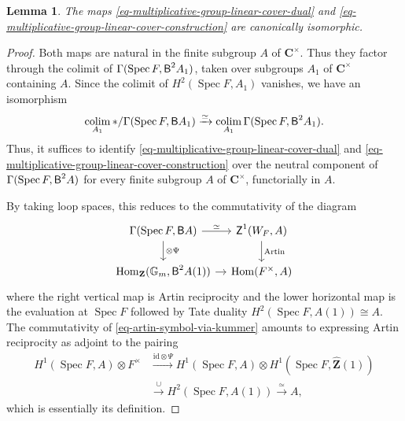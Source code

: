 \documentclass[10pt,english,reqno]{amsart}
\newcommand{\integers}{\mathbf Z}
\newcommand{\complexes}{\mathbf C}
\newcommand{\cycle}{\textnormal{\textsf{Z}}}
\newcommand{\Hom}{\operatorname{Hom}}
\newcommand{\id}{\mathrm{id}}
\newcommand{\deloop}{\textnormal{\textsf{B}}}
\DeclareMathOperator*\colim{colim}
\newcommand{\Spec}{\operatorname{Spec}}
\newtheorem{lem}[subsubsection]{Lemma}
\theoremstyle{definition}
\numberwithin{equation}{section}
\begin{document}
\begin{lem}
The maps \eqref{eq-multiplicative-group-linear-cover-dual} and \eqref{eq-multiplicative-group-linear-cover-construction} are canonically isomorphic.
\end{lem}
\begin{proof}
Both maps are natural in the finite subgroup $A$ of $\complexes^{\times}$. Thus they factor through the colimit of $\Gamma(\Spec F, \deloop^2A_1)$, taken over subgroups $A_1$ of $\complexes^{\times}$ containing $A$. Since the colimit of $H^2(\Spec F, A_1)$ vanishes, we have an isomorphism
$$
\colim_{A_1} */\Gamma(\Spec F, \deloop A_1) \xrightarrow{\simeq} \colim_{A_1} \Gamma(\Spec F, \deloop^2 A_1).
$$
Thus, it suffices to identify \eqref{eq-multiplicative-group-linear-cover-dual} and \eqref{eq-multiplicative-group-linear-cover-construction} over the neutral component of $\Gamma(\Spec F, \deloop^2A)$ for every finite subgroup $A$ of $\complexes^{\times}$, functorially in $A$.

By taking loop spaces, this reduces to the commutativity of the diagram
\begin{equation}
\label{eq-artin-symbol-via-kummer}
\begin{tikzcd}[column sep = 1em]
\Gamma(\Spec F, \deloop A) \ar[r, "\simeq"]\ar[d, "\otimes\Psi"] & \cycle^1(W_F, A) \ar[d, "\mathrm{Artin}"] \\
\Hom_{\integers}(\mathbb G_m, \deloop^2 A(1)) \ar[r] & \Hom(F^{\times}, A)
\end{tikzcd}
\end{equation}
where the right vertical map is Artin reciprocity and the lower horizontal map is the evaluation at $\Spec F$ followed by Tate duality $H^2(\Spec F, A(1)) \cong A$. The commutativity of \eqref{eq-artin-symbol-via-kummer} amounts to expressing Artin reciprocity as adjoint to the pairing
\begin{align*}
H^1(\Spec F, A) \otimes F^{\times} &\xrightarrow{\id\otimes\Psi} H^1(\Spec F, A) \otimes H^1(\Spec F, \hat{\integers}(1)) \\
& \xrightarrow{\cup} H^2(\Spec F, A(1)) \xrightarrow{\simeq} A,
\end{align*}
which is essentially its definition.
\end{proof}

\end{document}
